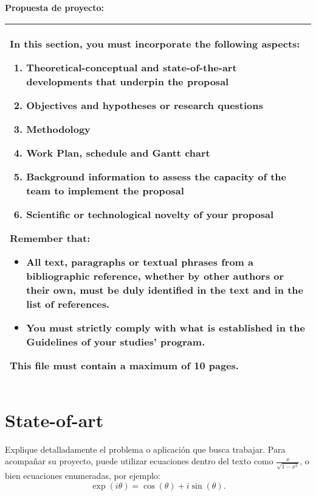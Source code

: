 \documentclass[MAIN.tex]{subfiles}
\begin{document}
\noindent\textbf{Propuesta de proyecto:}

\bigskip

\noindent\begin{tabularx}{\textwidth}{|>{\columncolor{tcc}}X|}
  \hline In this section, you must incorporate the following aspects:
  \begin{enumerate}[label={\alph*)},nosep]
  \item Theoretical-conceptual and state-of-the-art developments that
    underpin the proposal
  \item Objectives and hypotheses or research questions
  \item Methodology
  \item Work Plan, schedule and Gantt chart
  \item Background information to assess the capacity of the team to
    implement the proposal
  \item Scientific or technological novelty of your proposal
  \end{enumerate}

  \medskip

  Remember that:
  \begin{itemize}
  \item All text, paragraphs or textual phrases from a bibliographic
    reference, whether by other authors or their own, must be duly
    identified in the text and in the list of references.
  \item You must strictly comply with what is established in the
    Guidelines of your studies' program.
  \end{itemize}
  
  \medskip

  This file must contain a maximum of \textbf{10 pages}. \\
  \hline
\end{tabularx}

\section{State-of-art}

Explique detalladamente el problema o aplicación que busca
trabajar. Para acompañar su proyecto, puede utilizar ecuaciones dentro
del texto como $\frac{x}{\sqrt{1-x^2}}$, o bien ecuaciones enumeradas,
por ejemplo:
\begin{equation}\label{eq:euler}
\exp(i\theta) = \cos(\theta) + i\sin(\theta).
\end{equation}
\end{document}
